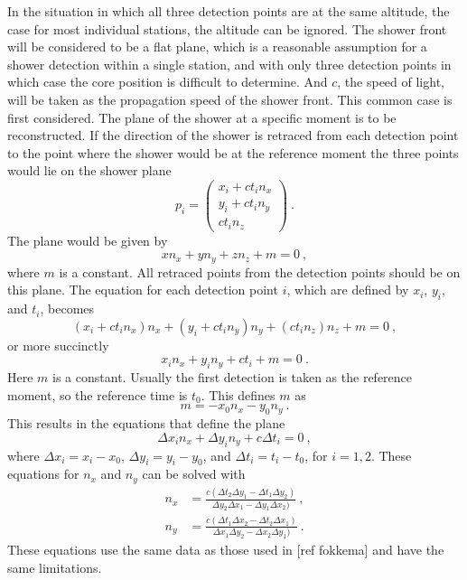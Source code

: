 In the situation in which all three detection points are at the same altitude, the case for most individual stations, the altitude can be ignored. The shower front will be considered to be a flat plane, which is a reasonable assumption for a shower detection within a single station, and with only three detection points in which case the core position is difficult to determine. And $c$, the speed of light, will be taken as the propagation speed of the shower front. This common case is first considered. The plane of the shower at a specific moment is to be reconstructed. If the direction of the shower is retraced from each detection point to the point where the shower would be at the reference moment the three points would lie on the shower plane
%
\begin{equation}
    p_i = \begin{pmatrix}
              x_i + c t_i n_x \\
              y_i + c t_i n_y \\
                    c t_i n_z
          \end{pmatrix} \ .
\end{equation}
%
The plane would be given by
%
\begin{equation}
    x n_x + y n_y + z n_z + m = 0 \ ,
\end{equation}
%
where $m$ is a constant. All retraced points from the detection points should be on this plane. The equation for each detection point $i$, which are defined by $x_i$, $y_i$, and $t_i$, becomes
%
\begin{equation}
    (x_i + c t_i n_x) n_x + (y_i + c t_i n_y) n_y + (c t_i n_z) n_z + m = 0 \ ,
\end{equation}
%
or more succinctly
%
\begin{equation}
    x_i n_x + y_i n_y + c t_i + m = 0 \ .
\end{equation}
%
Here $m$ is a constant. Usually the first detection is taken as the reference moment, so the reference time is $t_0$. This defines $m$ as
%
\begin{equation}
    m = - x_0 n_x - y_0 n_y \ .
\end{equation}
%
This results in the equations that define the plane
%
\begin{equation}
    \Delta x_i n_x + \Delta y_i n_y + c \Delta t_i = 0 \ ,
\end{equation}
%
where $\Delta x_i = x_i - x_0$, $\Delta y_i = y_i - y_0$, and $\Delta t_i = t_i - t_0$, for $i = 1,2$.
%
These equations for $n_x$ and $n_y$ can be solved with
%
\begin{equation}
    \begin{align}
        n_x &= \frac{c (\Delta t_2 \Delta y_1 - \Delta t_1 \Delta y_2)}
                    {\Delta y_2 \Delta x_1 - \Delta y_1 \Delta x_2)} \ , \\
        n_y &= \frac{c (\Delta t_1 \Delta x_2 - \Delta t_2 \Delta x_1)}
                    {\Delta x_1 \Delta y_2 - \Delta x_2 \Delta y_1)} \ .
    \end{align}
\end{equation}
%
These equations use the same data as those used in [ref fokkema] and have the same limitations.


